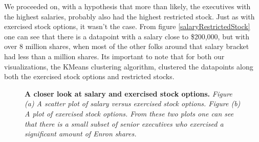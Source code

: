 \documentclass[twoside,openright,titlepage,numbers=noenddot,headinclude,%
               footinclude=true,cleardoublepage=empty,abstractoff,BCOR=5mm,%
               paper=a4,fontsize=11pt,ngerman,american]{scrreprt}
\numberwithin{theorem}{chapter}
\numberwithin{definition}{chapter}
\numberwithin{algorithm}{chapter}
\numberwithin{figure}{chapter}
\numberwithin{table}{chapter}
\numberwithin{equation}{chapter}
\begin{document}
We proceeded on, with a hypothesis that more than likely, the executives with the highest salaries, probably also had the highest restricted stock. Just as with exercised stock options, it wasn't the case. From figure \ref{salaryRestrictedStock} one can see that there is a datapoint with a salary close to \$200,000, but with over 8 million shares, when most of the other folks around that salary bracket had less than a million shares. Its important to note that for both our visualizations, the KMeans clustering algorithm, clustered the datapoints along both the exercised stock options and restricted stocks. 
\begin{figure}[!hbtp]
\centering
    
    \caption{\textbf{A closer look at salary and exercised stock options.} \textit{Figure (a) A scatter plot of salary versus exercised stock options. Figure (b) A plot of exercised stock options. From these two plots one can see that there is a small subset of senior executives who exercised a significant amount of Enron shares. }}
\end{figure}
\end{document}
